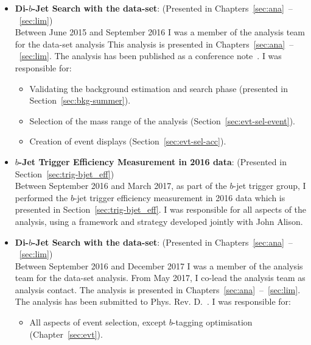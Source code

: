 \begin{itemize}[leftmargin=*]
\item\textbf{Di-$b$-Jet Search  with the \summer{} data-set}: (Presented in Chapters~\ref{sec:ana}~--~\ref{sec:lim})\\ 
  Between June 2015 and September 2016 I was a member of the analysis team for the \summer{} data-set analysis
  This analysis is presented in Chapters~\ref{sec:ana}~--~\ref{sec:lim}.
  The analysis has been published as a conference note~\cite{dibjet-ichep_conf}. 
  I was responsible for:
  \begin{itemize}
    \item Validating the background estimation and search phase (presented in Section~\ref{sec:bkg-summer}).
    \item Selection of the mass range of the analysis (Section~\ref{sec:evt-sel-event}).
    \item Creation of event displays (Section~\ref{sec:evt-sel-acc}).
  \end{itemize}
  \vspace{1em}
\item\textbf{$b$-Jet Trigger Efficiency Measurement in 2016 data}: (Presented in Section~\ref{sec:trig-bjet_eff})\\
  Between September 2016 and March 2017, as part of the $b$-jet trigger group,
  I performed the $b$-jet trigger efficiency measurement in 2016 data which is presented in Section~\ref{sec:trig-bjet_eff}.
  I was responsible for all aspects of the analysis, using a framework and strategy developed jointly with John Alison.
  \vspace{1em}
\item\textbf{Di-$b$-Jet Search with the \lm{} data-set}: (Presented in Chapters~\ref{sec:ana}~--~\ref{sec:lim})\\ 
  Between September 2016 and December 2017 I was a member of the analysis team for the \lm{} data-set analysis.
  From May 2017, I co-lead the analysis team as analysis contact.
  The analysis is presented in Chapters~\ref{sec:ana}~--~\ref{sec:lim}.
  The analysis has been submitted to Phys. Rev. D.~\cite{dibjet-full}.
  I was responsible for:
  \begin{itemize}
    \item All aspects of event selection, except $b$-tagging optimisation (Chapter~\ref{sec:evt}).

\end{itemize}
\end{itemize}
